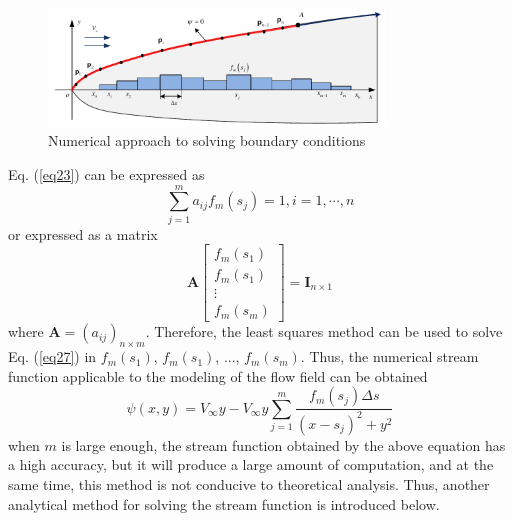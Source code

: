 \begin{figure}[th]
	\centering
	\includegraphics[width=0.8\textwidth]{Figures/Figs_Ch4/fig5.pdf}
	\caption{Numerical approach to solving boundary conditions}\label{fig5}
\end{figure} \noindent
Eq. (\ref{eq23}) can be expressed as
\begin{equation}\label{eq26}
\sum_{j=1}^m a_{i j} f_m\left(s_j\right)=1, i=1, \cdots, n
\end{equation}
or expressed as a matrix
\begin{equation}\label{eq27}
\mathbf{A}\left[\begin{array}{c}
f_m\left(s_1\right) \\
f_m\left(s_1\right) \\
\vdots \\
f_m\left(s_m\right)
\end{array}\right]=\mathbf{I}_{n \times 1}
\end{equation}
where $\mathbf{A}=(a_{ij})_{n\times m}$. Therefore, the least squares method can be used to solve Eq. (\ref{eq27}) in $f_m(s_1)$, $f_m(s_1)$, ..., $f_m(s_m)$. Thus, the numerical stream function applicable to the modeling of the flow field can be obtained
\begin{equation}\label{eq28}
\psi(x, y)=V_{\infty} y-V_{\infty} y \sum_{j=1}^m \frac{f_m\left(s_j\right) \Delta s}{\left(x-s_j\right)^2+y^2}
\end{equation}
when $m$ is large enough, the stream function obtained by the above equation has a high accuracy, but it will produce a large amount of computation, and at the same time, this method is not conducive to theoretical analysis. Thus, another analytical method for solving the stream function is introduced below.

